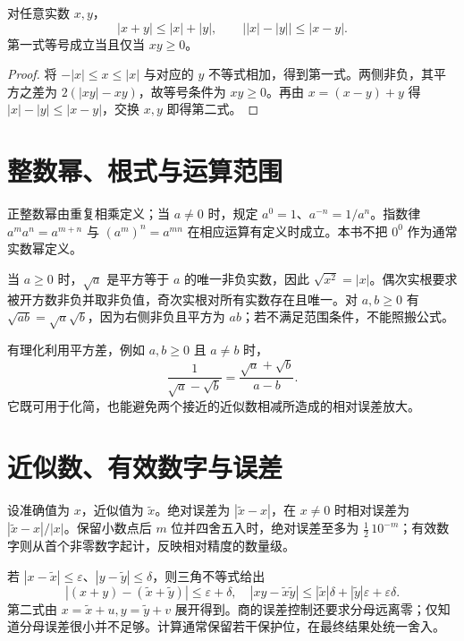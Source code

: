 \begin{theorem}[三角不等式与反三角不等式]
对任意实数 $x,y$，
\[
 |x+y|\le |x|+|y|,\qquad
 \bigl||x|-|y|\bigr|\le |x-y|.
\]
第一式等号成立当且仅当 $xy\ge0$。
\end{theorem}
\begin{proof}
将 $-|x|\le x\le|x|$ 与对应的 $y$ 不等式相加，得到第一式。两侧非负，其平方之差为 $2(|xy|-xy)$，故等号条件为 $xy\ge0$。再由 $x=(x-y)+y$ 得 $|x|-|y|\le|x-y|$，交换 $x,y$ 即得第二式。
\end{proof}

\section{整数幂、根式与运算范围}
正整数幂由重复相乘定义；当 $a\ne0$ 时，规定 $a^0=1$、$a^{-n}=1/a^n$。指数律 $a^ma^n=a^{m+n}$ 与 $(a^m)^n=a^{mn}$ 在相应运算有定义时成立。本书不把 $0^0$ 作为通常实数幂定义。

当 $a\ge0$ 时，$\sqrt a$ 是平方等于 $a$ 的唯一非负实数，因此 $\sqrt{x^2}=|x|$。偶次实根要求被开方数非负并取非负值，奇次实根对所有实数存在且唯一。对 $a,b\ge0$ 有 $\sqrt{ab}=\sqrt a\sqrt b$，因为右侧非负且平方为 $ab$；若不满足范围条件，不能照搬公式。

有理化利用平方差，例如 $a,b\ge0$ 且 $a\ne b$ 时，
\[
 \frac1{\sqrt a-\sqrt b}=\frac{\sqrt a+\sqrt b}{a-b}.
\]
它既可用于化简，也能避免两个接近的近似数相减所造成的相对误差放大。

\section{近似数、有效数字与误差}
设准确值为 $x$，近似值为 $\widetilde x$。绝对误差为 $|\widetilde x-x|$，在 $x\ne0$ 时相对误差为 $|\widetilde x-x|/|x|$。保留小数点后 $m$ 位并四舍五入时，绝对误差至多为 $\frac12\,10^{-m}$；有效数字则从首个非零数字起计，反映相对精度的数量级。

若 $|x-\widetilde x|\le\varepsilon$、$|y-\widetilde y|\le\delta$，则三角不等式给出
\[
 |(x+y)-(\widetilde x+\widetilde y)|\le\varepsilon+\delta,
 \quad
 |xy-\widetilde x\widetilde y|
 \le|\widetilde x|\delta+|\widetilde y|\varepsilon+\varepsilon\delta.
\]
第二式由 $x=\widetilde x+u,y=\widetilde y+v$ 展开得到。商的误差控制还要求分母远离零；仅知道分母误差很小并不足够。计算通常保留若干保护位，在最终结果处统一舍入。

